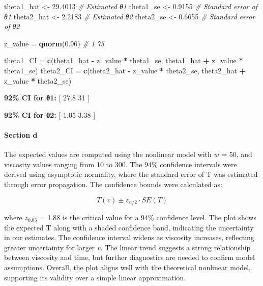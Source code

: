 \documentclass[
  11pt,
]{article}
\newenvironment{Shaded}{\begin{snugshade}}{\end{snugshade}}
\newcommand{\CommentTok}[1]{\textcolor[rgb]{0.56,0.35,0.01}{\textit{#1}}}
\newcommand{\FloatTok}[1]{\textcolor[rgb]{0.00,0.00,0.81}{#1}}
\newcommand{\FunctionTok}[1]{\textcolor[rgb]{0.13,0.29,0.53}{\textbf{#1}}}
\newcommand{\NormalTok}[1]{#1}
\newcommand{\OtherTok}[1]{\textcolor[rgb]{0.56,0.35,0.01}{#1}}
\newcommand{\SpecialCharTok}[1]{\textcolor[rgb]{0.81,0.36,0.00}{\textbf{#1}}}
\begin{document}
\begin{Shaded}
\begin{Highlighting}[]
\NormalTok{theta1\_hat }\OtherTok{\textless{}{-}} \FloatTok{29.4013}  \CommentTok{\# Estimated θ1}
\NormalTok{theta1\_se }\OtherTok{\textless{}{-}} \FloatTok{0.9155}    \CommentTok{\# Standard error of θ1}
\NormalTok{theta2\_hat }\OtherTok{\textless{}{-}} \FloatTok{2.2183}   \CommentTok{\# Estimated θ2}
\NormalTok{theta2\_se }\OtherTok{\textless{}{-}} \FloatTok{0.6655}    \CommentTok{\# Standard error of θ2}

\NormalTok{z\_value }\OtherTok{=} \FunctionTok{qnorm}\NormalTok{(}\FloatTok{0.96}\NormalTok{)  }\CommentTok{\# 1.75}

\NormalTok{theta1\_CI }\OtherTok{=} \FunctionTok{c}\NormalTok{(theta1\_hat }\SpecialCharTok{{-}}\NormalTok{ z\_value }\SpecialCharTok{*}\NormalTok{ theta1\_se, theta1\_hat }\SpecialCharTok{+}\NormalTok{ z\_value }\SpecialCharTok{*}\NormalTok{ theta1\_se)}
\NormalTok{theta2\_CI }\OtherTok{=} \FunctionTok{c}\NormalTok{(theta2\_hat }\SpecialCharTok{{-}}\NormalTok{ z\_value }\SpecialCharTok{*}\NormalTok{ theta2\_se, theta2\_hat }\SpecialCharTok{+}\NormalTok{ z\_value }\SpecialCharTok{*}\NormalTok{ theta2\_se)}
\end{Highlighting}
\end{Shaded}

\textbf{92\% CI for θ1:} {[} 27.8 31 {]}

\textbf{92\% CI for θ2:} {[} 1.05 3.38 {]}

\paragraph{Section d}\label{section-d-1}

The expected values are computed using the nonlinear model with \(w\) =
50, and viscosity values ranging from 10 to 300. The 94\% confidence
intervals were derived using asymptotic normality, where the standard
error of T was estimated through error propagation. The confidence
bounds were calculated as:

\[T(v) \pm z_{\alpha/2} \cdot SE(T)\]

where \(z_{0.03}\) = 1.88 is the critical value for a 94\% confidence
level. The plot shows the expected T along with a shaded confidence
band, indicating the uncertainty in our estimates. The confidence
interval widens as viscosity increases, reflecting greater uncertainty
for larger \(v\). The linear trend suggests a strong relationship
between viscosity and time, but further diagnostics are needed to
confirm model assumptions. Overall, the plot aligns well with the
theoretical nonlinear model, supporting its validity over a simple
linear approximation.
\end{document}
